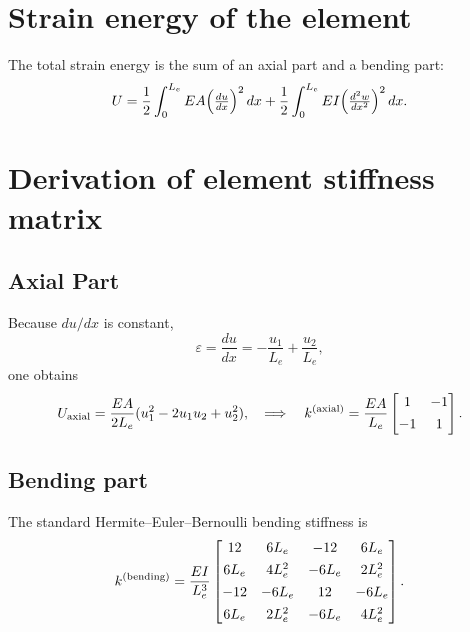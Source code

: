 \documentclass{article}
\begin{document}
	\section{Strain energy of the element}
	The total strain energy is the sum of an axial part and a bending part:
	\[
	U = \frac12 \int_{0}^{L_e} EA\Bigl(\tfrac{du}{dx}\Bigr)^2\,dx
	+ \frac12 \int_{0}^{L_e} EI\Bigl(\tfrac{d^2w}{dx^2}\Bigr)^2\,dx.
	\]
	
	\section{Derivation of element stiffness matrix}
	\subsection{Axial Part}
	Because \(du/dx\) is constant,
	\[
	\varepsilon = \frac{du}{dx} = -\frac{u_1}{L_e} + \frac{u_2}{L_e},
	\]
	one obtains
	\[
	U_{\rm axial}
	= \frac{EA}{2L_e}(u_1^2 - 2u_1u_2 + u_2^2),
	\quad\Longrightarrow\quad
	k^{(\rm axial)} = \frac{EA}{L_e}
	\begin{bmatrix}1 & -1\\[4pt] -1 & 1\end{bmatrix}.
	\]
	
	\subsection{Bending part}
	The standard Hermite–Euler–Bernoulli bending stiffness is
	\[
	k^{(\rm bending)}
	= \frac{EI}{L_e^3}
	\begin{bmatrix}
		12      &  6L_e   & -12     &  6L_e\\[4pt]
		6L_e    &  4L_e^2 & -6L_e   &  2L_e^2\\[4pt]
		-12      & -6L_e   &  12     & -6L_e\\[4pt]
		6L_e    &  2L_e^2 & -6L_e   &  4L_e^2
	\end{bmatrix}.
	\]
	
\end{document}
